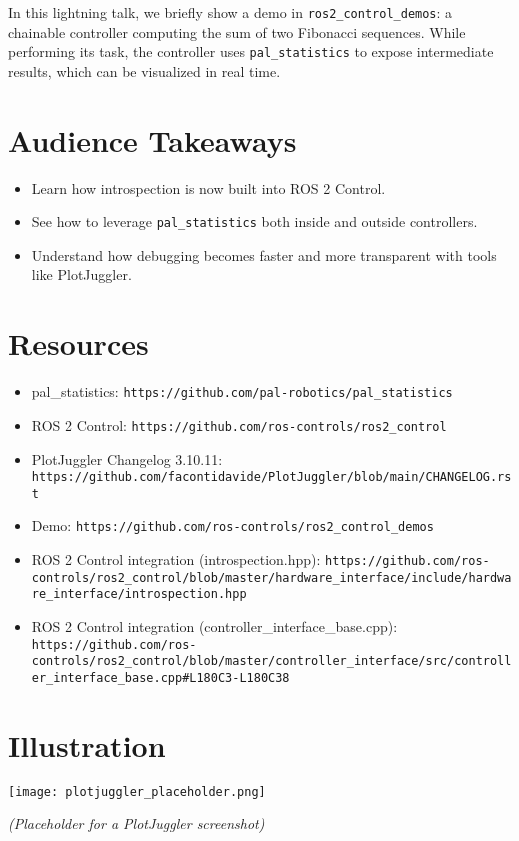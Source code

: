 \documentclass[11pt,a4paper]{article}
\begin{document}
In this lightning talk, we briefly show a demo in \texttt{ros2\_control\_demos}: a chainable controller computing the sum of two Fibonacci sequences. While performing its task, the controller uses \texttt{pal\_statistics} to expose intermediate results, which can be visualized in real time.  

\section*{Audience Takeaways}
\begin{itemize}
  \item Learn how introspection is now built into ROS 2 Control.
  \item See how to leverage \texttt{pal\_statistics} both inside and outside controllers.
  \item Understand how debugging becomes faster and more transparent with tools like PlotJuggler.
\end{itemize}

\section*{Resources}
\begin{itemize}
  \item pal\_statistics: \texttt{https://github.com/pal-robotics/pal\_statistics}
  \item ROS 2 Control: \texttt{https://github.com/ros-controls/ros2\_control}
  \item PlotJuggler Changelog 3.10.11: \texttt{https://github.com/facontidavide/PlotJuggler/blob/main/CHANGELOG.rst}
  \item Demo: \texttt{https://github.com/ros-controls/ros2\_control\_demos}
  \item ROS 2 Control integration (introspection.hpp): \texttt{https://github.com/ros-controls/ros2\_control/blob/master/hardware\_interface/include/hardware\_interface/introspection.hpp}
  \item ROS 2 Control integration (controller\_interface\_base.cpp): \texttt{https://github.com/ros-controls/ros2\_control/blob/master/controller\_interface/src/controller\_interface\_base.cpp\#L180C3-L180C38}
\end{itemize}

\section*{Illustration}
\begin{center}
\texttt{[image: plotjuggler\_placeholder.png]}
\end{center}
\textit{(Placeholder for a PlotJuggler screenshot)}
\end{document}
